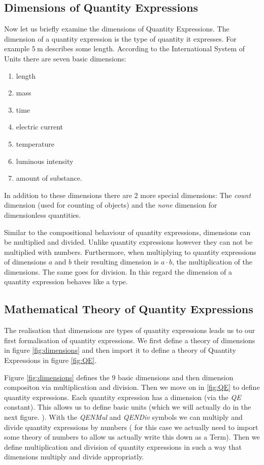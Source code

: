 \subsection{Dimensions of Quantity Expressions}
Now let us briefly examine the dimensions of Quantity Expressions. The dimension of a quantity expression is the type of quantity it expresses. For example $5\ \text{m}$ describes some length. According to the International System of Units there are seven basic dimensions:
\begin{enumerate}
  \item length
  \item mass
  \item time
  \item electric current
  \item temperature
  \item luminous intensity
  \item amount of substance.
\end{enumerate}

In addition to these dimensions there are 2 more special dimensions: The \textit{count} dimension (used for counting of objects) and the \textit{none} dimension for dimensionless quantities. 

Similar to the compositional behaviour of quantity expressions, dimensions can be multiplied and divided. Unlike quantity expressions however they can not be multiplied with numbers. Furthermore, when multiplying to quantity expressions of dimensions $a$ and $b$ their resulting dimension is $a \cdot{} b$, the multiplication of the dimensions. The same goes for division. In this regard the dimension of a quantity expression behaves like a type.

\subsection{Mathematical Theory of Quantity Expressions}
\label{sec:qeform}

The realisation that dimensions are types of quantity expressions leads us to our first formalisation of quantity expressions. We first define a theory of dimensions in figure \ref{fig:dimensions} and then import it to define a theory of Quantity Expressions in figure \ref{fig:QE}.





Figure \ref{fig:dimensions} defines the 9 basic dimensions and then dimension compositon via multiplication and division. Then we move on in \ref{fig:QE} to define quantity expressions. Each quantity expression has a dimension (via the \textit{QE} constant). This allows us to define basic units (which we will actually do in the next figure. ). With the \textit{QENMul} and \textit{QENDiv} symbols we can multiply and divide quantity expressions by numbers ( for this case we actually need to import some theory of numbers to allow us actually write this down as a Term). Then we define multiplication and division of quantity expressions in such a way that dimensions multiply and divide appropriatly.

